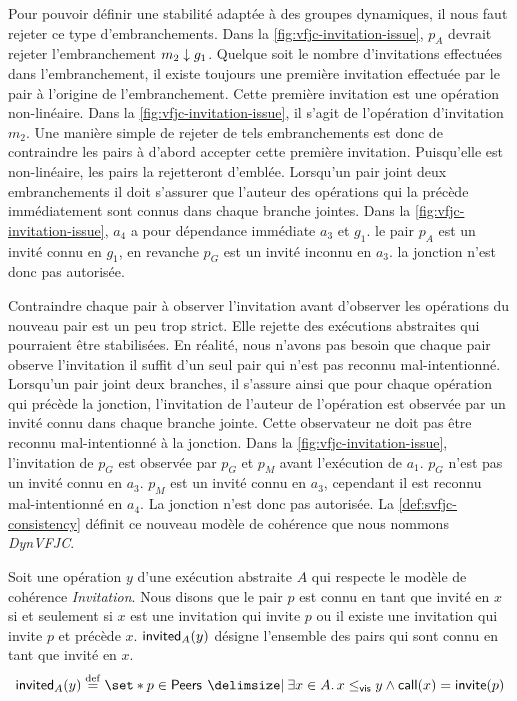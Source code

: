 Pour pouvoir définir une stabilité adaptée à des groupes dynamiques, il nous faut rejeter ce type d'embranchements.
Dans la \autoref{fig:vfjc-invitation-issue}, $p_A$ devrait rejeter l'embranchement $m_2 \downarrow g_1$.
Quelque soit le nombre d'invitations effectuées dans l'embranchement, il existe toujours une première invitation effectuée par le pair à l'origine de l'embranchement.
Cette première invitation est une opération non-linéaire.
Dans la \autoref{fig:vfjc-invitation-issue}, il s'agit de l'opération d'invitation $m_2$.
Une manière simple de rejeter de tels embranchements est donc de contraindre les pairs à d'abord accepter cette première invitation.
Puisqu'elle est non-linéaire, les pairs la rejetteront d'emblée.
Lorsqu'un pair joint deux embranchements il doit s'assurer que l'auteur des opérations qui la précède immédiatement sont connus dans chaque branche jointes.
Dans la \autoref{fig:vfjc-invitation-issue}, $a_4$ a pour dépendance immédiate $a_3$ et $g_1$.
le pair $p_A$ est un invité connu en $g_1$, en revanche $p_G$ est un invité inconnu en $a_3$.
la jonction n'est donc pas autorisée.

Contraindre chaque pair à observer l'invitation avant d'observer les opérations du nouveau pair est un peu trop strict.
Elle rejette des exécutions abstraites qui pourraient être stabilisées.
En réalité, nous n'avons pas besoin que chaque pair observe l'invitation il suffit d'un seul pair qui n'est pas reconnu mal-intentionné.
Lorsqu'un pair joint deux branches, il s'assure ainsi que pour chaque opération qui précède la jonction, l'invitation de l'auteur de l'opération est observée par un invité connu dans chaque branche jointe.
Cette observateur ne doit pas être reconnu mal-intentionné à la jonction.
Dans la \autoref{fig:vfjc-invitation-issue}, l'invitation de $p_G$ est observée par $p_G$ et $p_M$ avant l'exécution de $a_1$.
$p_G$ n'est pas un invité connu en $a_3$.
$p_M$ est un invité connu en $a_3$, cependant il est reconnu mal-intentionné en $a_4$.
La jonction n'est donc pas autorisée.
La \autoref{def:svfjc-consistency} définit ce nouveau modèle de cohérence que nous nommons \emph{DynVFJC}.

\begin{definition}\label{def:known-invited}
Soit une opération $y$ d'une exécution abstraite $A$ qui respecte le modèle de cohérence \emph{Invitation}.
Nous disons que le pair $p$ est connu en tant que invité en $x$ si et seulement si $x$ est une invitation qui invite $p$ ou il existe une invitation qui invite $p$  et précède $x$.
$\operatorname{\mathsf{invited}}_A(y)$ désigne l'ensemble des pairs qui sont connu en tant que invité en $x$.
\begin{equation*}
    \trm{invited}_A(y) \defeq \set*{p \in \trm{Peers} \given \exists x \in A \qsep x \viseq y \land \trm{call}(x) = \trm{invite}(p)}
\end{equation*}
\end{definition}

